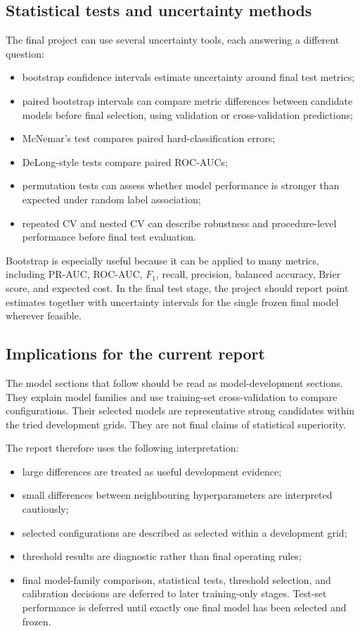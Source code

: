 \subsection{Statistical tests and uncertainty methods}

The final project can use several uncertainty tools, each answering a different question:
\begin{itemize}
    \item bootstrap confidence intervals estimate uncertainty around final test metrics;
    \item paired bootstrap intervals can compare metric differences between candidate models before final selection, using validation or cross-validation predictions;
    \item McNemar's test compares paired hard-classification errors;
    \item DeLong-style tests compare paired ROC-AUCs;
    \item permutation tests can assess whether model performance is stronger than expected under random label association;
    \item repeated CV and nested CV can describe robustness and procedure-level performance before final test evaluation.
\end{itemize}

Bootstrap is especially useful because it can be applied to many metrics, including PR-AUC, ROC-AUC, \(F_1\), recall, precision, balanced accuracy, Brier score, and expected cost. In the final test stage, the project should report point estimates together with uncertainty intervals for the single frozen final model wherever feasible.

\subsection{Implications for the current report}

The model sections that follow should be read as model-development sections. They explain model families and use training-set cross-validation to compare configurations. Their selected models are representative strong candidates within the tried development grids. They are not final claims of statistical superiority.

The report therefore uses the following interpretation:
\begin{itemize}
    \item large differences are treated as useful development evidence;
    \item small differences between neighbouring hyperparameters are interpreted cautiously;
    \item selected configurations are described as selected within a development grid;
    \item threshold results are diagnostic rather than final operating rules;
    \item final model-family comparison, statistical tests, threshold selection, and calibration decisions are deferred to later training-only stages. Test-set performance is deferred until exactly one final model has been selected and frozen.
\end{itemize}

